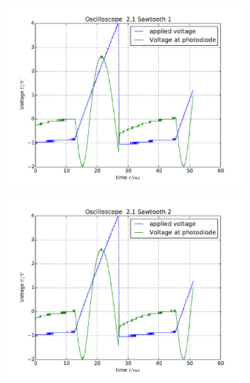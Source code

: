 \begin{figure}
    \begin{subfigure}[b]{\picwidth}
        \includegraphics[width=\textwidth]{analysis/figures/21sawtooth1}
        \caption{}
    \end{subfigure}\qquad
    \begin{subfigure}[b]{\picwidth}
        \includegraphics[width=\textwidth]{analysis/figures/21sawtooth2}
        \caption{}
    \end{subfigure}
    \begin{subfigure}[b]{\picwidth}

\end{subfigure}
\end{figure}
